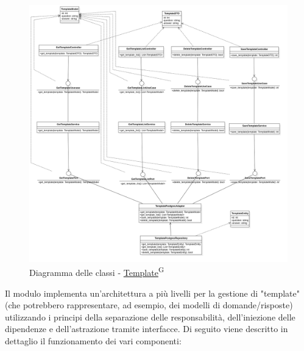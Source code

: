     \begin{figure}[H]
        \centering
        \includegraphics[width=\linewidth, height=0.8\textheight, keepaspectratio]{./img/png/Model7!Template_7.png}
        \caption{Diagramma delle classi - \href{https://code7crusaders.github.io/docs/PB/documentazione_interna/glossario.html#template}{Template}\textsuperscript{G}}
        \label{fig:template}
    \end{figure}

    Il modulo implementa un'architettura a più livelli per la gestione di "template" (che potrebbero rappresentare, ad esempio, dei modelli di domande/risposte) utilizzando i principi della separazione delle responsabilità, dell'iniezione delle dipendenze e dell'astrazione tramite interfacce. Di seguito viene descritto in dettaglio il funzionamento dei vari componenti:
    
